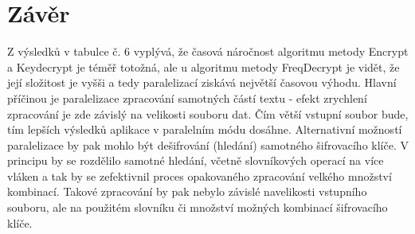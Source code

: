 \documentclass{article}
\begin{document}
\section{Závěr}
Z výsledků v tabulce č. 6 vyplývá, že časová náročnost algoritmu metody Encrypt a Keydecrypt je téměř totožná, ale u algoritmu metody FreqDecrypt je vidět, že její složitost je vyšši a tedy paralelizací ziskává největší časovou výhodu. Hlavní příčinou je paralelizace zpracování samotných částí textu - efekt zrychlení zpracování je zde závislý na velikosti souboru dat. Čím větší vstupní soubor bude, tím lepších výsledků aplikace v paralelním módu dosáhne.
Alternativní možností paralelizace by pak mohlo být dešifrování (hledání) samotného šifrovacího klíče. V principu by se rozdělilo samotné hledání, včetně slovníkových operací na více vláken a tak by se zefektivnil proces opakovaného zpracování velkého množství kombinací. Takové zpracování by pak nebylo závislé navelikosti vstupního souboru, ale na použitém slovníku či množství možných kombinací šifrovacího klíče.
\end{document}
